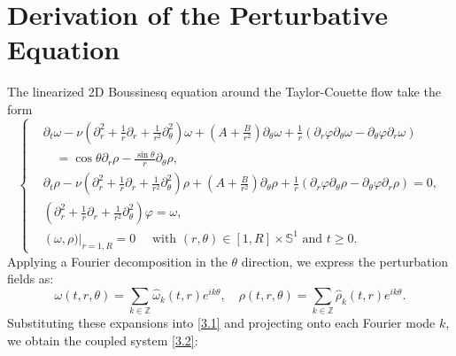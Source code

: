 \documentclass[final, 12pt,reqno]{amsart}
\numberwithin{equation}{section}
\begin{document}
 \section{Derivation of the Perturbative Equation }
The linearized 2D  Boussinesq equation around the Taylor-Couette  flow take the form
\begin{equation}\label{3.1}
    \left\{
\begin{aligned}
    &   \partial_t \omega-\nu \left(\partial_r^2+\frac{1}{r} \partial_r+\frac{1}{r^2} \partial_\theta^2\right)\omega+\left(A+\frac{B}{r^2}\right) \partial_\theta \omega+\frac{1}{r}\left(\partial_r \varphi \partial_\theta \omega-\partial_\theta \varphi \partial_r \omega\right)\\
    &\quad=\cos\theta\partial_{r}\rho-\frac{\sin\theta}{r}\partial_{\theta}\rho, \\
    &   \partial_t \rho-\nu\left(\partial_r^2+\frac{1}{r} \partial_r+\frac{1}{r^2} \partial_\theta^2\right) \rho+\left(A+\frac{B}{r^2}\right) \partial_\theta \rho+\frac{1}{r}\left(\partial_r \varphi \partial_\theta \rho-\partial_\theta \varphi \partial_r \rho\right)=0, \\
&   \left(\partial_r^2+\frac{1}{r} \partial_r+\frac{1}{r^2} \partial_\theta^2\right) \varphi=\omega,\\
&\left (\omega,\rho)\right|_{r=1, R}=0 \quad \text { with }(r, \theta) \in[1, R] \times \mathbb{S}^1 \text { and } t \geq 0 .
    \end{aligned}
\right.
\end{equation}
Applying a Fourier decomposition in the $\theta$ direction, we express the perturbation fields as:
\[
\omega(t,r,\theta) = \sum_{k\in\mathbb{Z}} \hat{\omega}_k(t,r) e^{ik\theta}, \quad \rho(t,r,\theta) = \sum_{k\in\mathbb{Z}} \hat{\rho}_k(t,r) e^{ik\theta}.
\]
Substituting these expansions into \eqref{3.1} and projecting onto each Fourier mode \(k\), we obtain the coupled system \eqref{3.2}:
\end{document}
